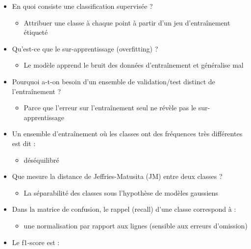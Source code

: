 \documentclass[
  french,
  11pt,
  letterpaper,
  open=any,
  twoside=false,
  french]{scrbook}
\providecommand{\tightlist}{%
  \setlength{\itemsep}{0pt}\setlength{\parskip}{0pt}}
\begin{document}
\begin{itemize}
\tightlist
\item
  En quoi consiste une classification supervisée ?

  \begin{itemize}
  \tightlist
  \item
    Attribuer une classe à chaque point à partir d'un jeu d'entraînement
    étiqueté
  \end{itemize}
\item
  Qu'est-ce que le sur-apprentissage (overfitting) ?

  \begin{itemize}
  \tightlist
  \item
    Le modèle apprend le bruit des données d'entraînement et généralise
    mal
  \end{itemize}
\item
  Pourquoi a-t-on besoin d'un ensemble de validation/test distinct de
  l'entraînement ?

  \begin{itemize}
  \tightlist
  \item
    Parce que l'erreur sur l'entraînement seul ne révèle pas le
    sur-apprentissage
  \end{itemize}
\item
  Un ensemble d'entraînement où les classes ont des fréquences très
  différentes est dit :

  \begin{itemize}
  \tightlist
  \item
    déséquilibré
  \end{itemize}
\item
  Que mesure la distance de Jeffries-Matusita (JM) entre deux classes ?

  \begin{itemize}
  \tightlist
  \item
    La séparabilité des classes sous l'hypothèse de modèles gaussiens
  \end{itemize}
\item
  Dans la matrice de confusion, le rappel (recall) d'une classe
  correspond à :

  \begin{itemize}
  \tightlist
  \item
    une normalisation par rapport aux lignes (sensible aux erreurs
    d'omission)
  \end{itemize}
\item
  Le f1-score est :


\end{itemize}
\end{document}
